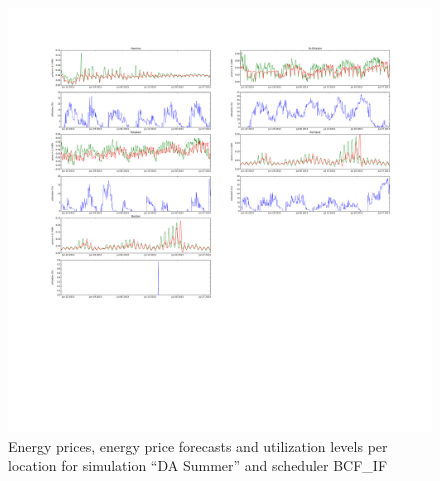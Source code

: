 \begin{figure}[htbp]
	\centering
	\vspace*{-0.6in}
	\hspace*{-1.9in}
		\includegraphics[width=1.60\textwidth]{figures/appendix_simulation_results/DA_Summer_scenario_4.pdf}
	\vspace*{-2.8in}
	\caption{Energy prices, energy price forecasts and utilization levels per location for simulation ``DA Summer'' and scheduler BCF\_IF}
	\label{fig:app_DA_Summer_scenario_4}
\end{figure}

